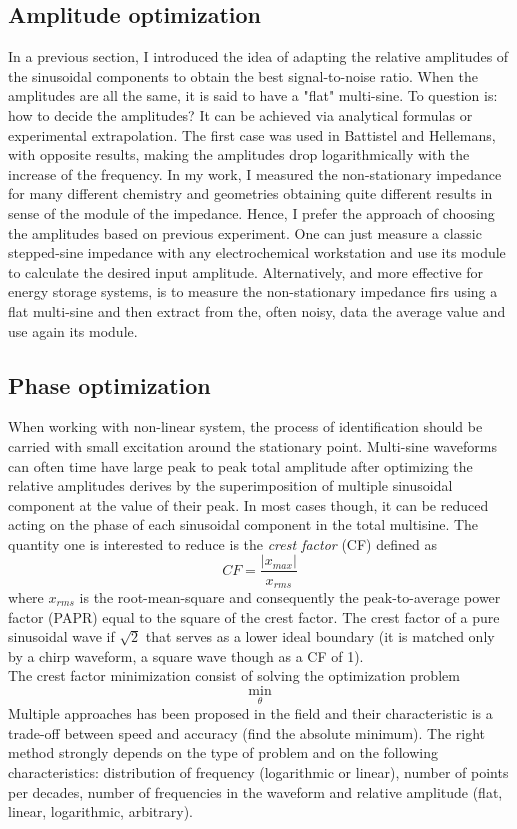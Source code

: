 \subsection{Amplitude optimization}
In a previous section, I introduced the idea of adapting the relative amplitudes of the sinusoidal components to obtain the best signal-to-noise ratio. When the amplitudes are all the same, it is said to have a "flat" multi-sine. To question is: how to decide the amplitudes?  It can be achieved via analytical formulas or experimental extrapolation. The first case was used in Battistel and Hellemans, with opposite results, making the amplitudes drop logarithmically with the increase of the frequency.  In my work, I measured the non-stationary impedance for many different chemistry and geometries obtaining quite different results in sense of the module of the impedance. Hence, I prefer the approach of choosing the amplitudes based on previous experiment. One can just measure a classic stepped-sine impedance with any electrochemical workstation and use its module to calculate the desired input amplitude. Alternatively, and more effective for energy storage systems, is to measure the non-stationary impedance firs using a flat multi-sine and then extract from the, often noisy, data the average value and use again its module.

\subsection{Phase optimization}
When working with non-linear system, the process of identification should be carried with small excitation around the stationary point. Multi-sine waveforms can often time have large peak to peak total amplitude after optimizing the relative amplitudes derives by the superimposition of multiple sinusoidal component at the value of their peak. In most cases though, it can be reduced acting on the phase of each sinusoidal component in the total multisine. The quantity one is interested to reduce is the \textit{crest factor} (CF) defined as
$$
CF = \frac{|x_{max}|}{x_{rms}}
$$
where $x_{rms}$ is the root-mean-square and consequently the peak-to-average power factor (PAPR) equal to the square of the crest factor. The crest factor of a pure sinusoidal wave if $\sqrt{2}$ that serves as a lower ideal boundary  (it is matched only by a chirp waveform, a square wave though as a CF of 1).  \\

The crest factor minimization consist of solving the optimization problem
$$
\min _\theta 
$$
Multiple approaches has been proposed in the field and their characteristic is a trade-off between speed and accuracy (find the absolute minimum). The right method strongly depends on the type of problem and on the following characteristics: distribution of frequency (logarithmic or linear), number of points per decades, number of frequencies in the waveform and relative amplitude (flat, linear, logarithmic, arbitrary). \\

